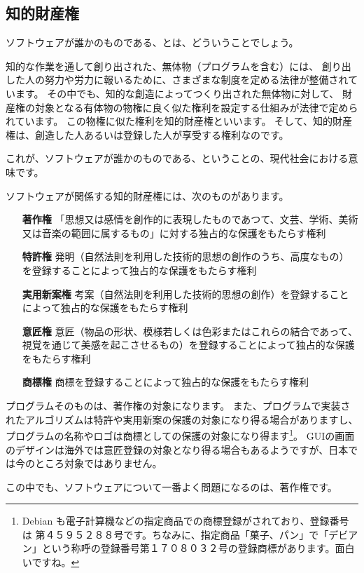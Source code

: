 \documentclass[mingoth,a4paper]{jsarticle}
\begin{document}
\subsection{知的財産権}

ソフトウェアが誰かのものである、とは、どういうことでしょう。

知的な作業を通して創り出された、無体物（プログラムを含む）には、
創り出した人の努力や労力に報いるために、さまざまな制度を定める法律が整備されています。
その中でも、知的な創造によってつくり出された無体物に対して、
財産権の対象となる有体物の物権に良く似た権利を設定する仕組みが法律で定められています。
この物権に似た権利を知的財産権といいます。
そして、知的財産権は、創造した人あるいは登録した人が享受する権利なのです。

これが、ソフトウェアが誰かのものである、ということの、現代社会における意味です。

ソフトウェアが関係する知的財産権には、次のものがあります。

\begin{itemize}
\item[{\bf{著作権}}] 「思想又は感情を創作的に表現したものであつて、文芸、学術、美術又は音楽の範囲に属するもの」に対する独占的な保護をもたらす権利
\item[{\bf{特許権}}]  発明（自然法則を利用した技術的思想の創作のうち、高度なもの）を登録することによって独占的な保護をもたらす権利
\item[{\bf{実用新案権}}] 考案（自然法則を利用した技術的思想の創作）を登録することによって独占的な保護をもたらす権利
\item[{\bf{意匠権}}] 意匠（物品の形状、模様若しくは色彩またはこれらの結合であって、視覚を通じて美感を起こさせるもの）を登録することによって独占的な保護をもたらす権利
\item[{\bf{商標権}}] 商標を登録することによって独占的な保護をもたらす権利
\end{itemize}

プログラムそのものは、著作権の対象になります。
また、プログラムで実装されたアルゴリズムは特許や実用新案の保護の対象になり得る場合がありますし、プログラムの名称やロゴは商標としての保護の対象になり得ます\footnote{Debian も電子計算機などの指定商品での商標登録がされており、登録番号は 第４５９５２８８号です。ちなみに、指定商品「菓子、パン」で「デビアン」という称呼の登録番号第１７０８０３２号の登録商標があります。面白いですね。}。
GUIの画面のデザインは海外では意匠登録の対象となり得る場合もあるようですが、日本では今のところ対象ではありません。

この中でも、ソフトウェアについて一番よく問題になるのは、著作権です。
\end{document}
